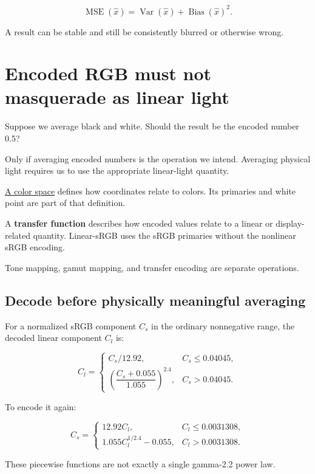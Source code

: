 \[
\operatorname{MSE}(\hat x)
=\operatorname{Var}(\hat x)+\operatorname{Bias}(\hat x)^2.
\]

A result can be stable and still be consistently blurred or otherwise wrong.

\section{Encoded RGB must not masquerade as linear light}\label{04-visual-computing-ii-ch043-encoded-rgb-must-not-masquerade-as-linear-light}

Suppose we average black and white. Should the result be the encoded number 0.5?

Only if averaging encoded numbers is the operation we intend. Averaging physical light requires us to use the appropriate linear-light quantity.

\hyperref[appendix-a9f83ad40792]{A color space} defines how coordinates relate to colors. Its primaries and white point are part of that definition.

A \textbf{transfer function} describes how encoded values relate to a linear or display-related quantity. Linear-sRGB uses the sRGB primaries without the nonlinear sRGB encoding.

Tone mapping, gamut mapping, and transfer encoding are separate operations.

\subsection{Decode before physically meaningful averaging}\label{04-visual-computing-ii-ch043-decode-before-physically-meaningful-averaging}

For a normalized sRGB component \(C_s\) in the ordinary nonnegative range, the decoded linear component \(C_l\) is:

\[
C_l=
\begin{cases}
C_s/12.92,&C_s\leq0.04045,\\
\left(\dfrac{C_s+0.055}{1.055}\right)^{2.4},
&C_s>0.04045.
\end{cases}
\]

To encode it again:

\[
C_s=
\begin{cases}
12.92C_l,&C_l\leq0.0031308,\\
1.055C_l^{1/2.4}-0.055,&C_l>0.0031308.
\end{cases}
\]

These piecewise functions are not exactly a single gamma-2.2 power law.

